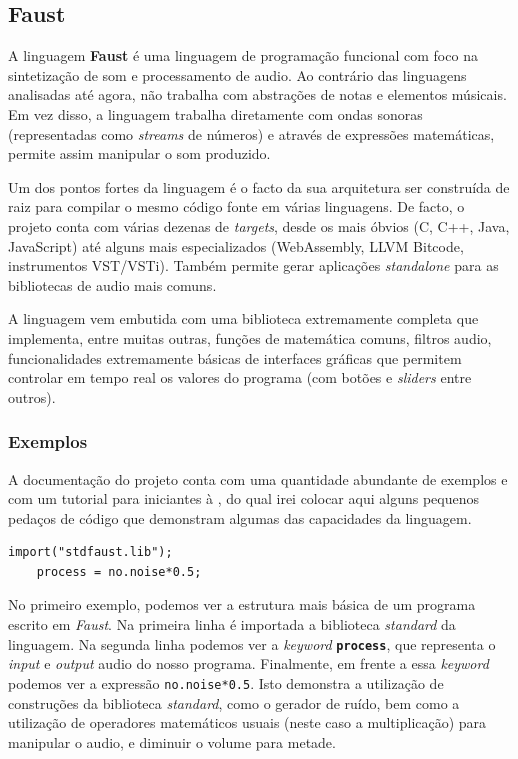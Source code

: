 \documentclass[
  oneside,
  11pt, a4paper,
  footinclude=true,
  headinclude=true,
  cleardoublepage=empty
]{scrbook}
\begin{document}
	\subsection{Faust}
	A linguagem \textbf{Faust}\cite{faust} é uma linguagem de programação funcional com foco na sintetização de som e processamento de audio. Ao contrário das linguagens analisadas até agora, não trabalha com abstrações de notas e elementos músicais. Em vez disso, a linguagem trabalha diretamente com ondas sonoras (representadas como \textit{streams} de números) e através de expressões matemáticas, permite assim manipular o som produzido.
	
	Um dos pontos fortes da linguagem é o facto da sua arquitetura ser construída de raiz para compilar o mesmo código fonte em várias linguagens. De facto, o projeto conta com várias dezenas de \textit{targets}, desde os mais óbvios (C, C++, Java, JavaScript) até alguns mais especializados (WebAssembly, LLVM Bitcode, instrumentos VST/VSTi). Também permite gerar aplicações \textit{standalone} para as bibliotecas de audio mais comuns\cite{faust-targets}.
	
	
	A linguagem vem embutida com uma biblioteca extremamente completa\cite{faust-libraries} que implementa, entre muitas outras, funções de matemática comuns, filtros audio, funcionalidades extremamente básicas de interfaces gráficas que permitem controlar em tempo real os valores do programa (com botões e \textit{sliders} entre outros).
	
	\subsubsection{Exemplos}
	A documentação do projeto conta com uma quantidade abundante de exemplos\cite{faust-examples} e com um tutorial para iniciantes à \cite{faust-quickstart}, do qual irei colocar aqui alguns pequenos pedaços de código que demonstram algumas das capacidades da linguagem.
	
    \begin{lstlisting}[caption={Geração de ruído aleatório com volume a metade}]
    import("stdfaust.lib");
    process = no.noise*0.5;
    \end{lstlisting}
    
	No primeiro exemplo, podemos ver a estrutura mais básica de um programa escrito em \textit{Faust}. Na primeira linha é importada a biblioteca \textit{standard} da linguagem. Na segunda linha podemos ver a \textit{keyword} \textbf{\texttt{process}}, que representa o \textit{input} e \textit{output} audio do nosso programa. Finalmente, em frente a essa \textit{keyword} podemos ver a expressão \texttt{no.noise*0.5}. Isto demonstra a utilização de construções da biblioteca \textit{standard}, como o gerador de ruído, bem como a utilização de operadores matemáticos usuais (neste caso a multiplicação) para manipular o audio, e diminuir o volume para metade.
	
\end{document}
